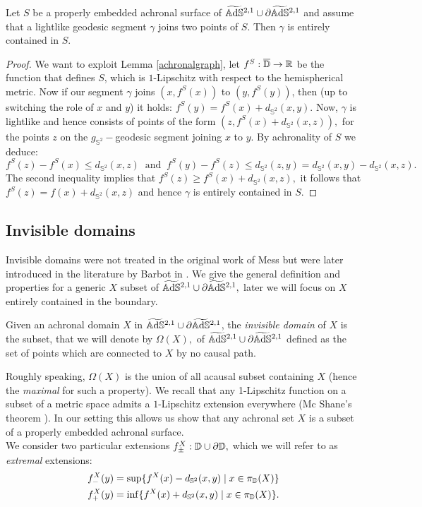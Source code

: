 \begin{lemma}\label{containedgeo}
    Let $S$ be a properly embedded achronal surface of $\widetilde{\mathbb{A}\mathrm{d}\mathbb{S}}{}^{2,1}\cup\partial\widetilde{\mathbb{A}\mathrm{d}\mathbb{S}}{}^{2,1}$ and assume that a lightlike geodesic segment $\gamma$ joins two points of $S$. Then $\gamma$ is entirely contained in $S.$
\end{lemma}
\begin{proof}
    We want to exploit Lemma \ref{achronalgraph}, let $f^S:\overline{\mathbb{D}}\to\mathbb{R}$ be the function that defines $S$, which is $1$-Lipschitz with respect to the hemispherical metric. Now if our segment $\gamma$ joins $(x,f^S(x))$ to $(y,f^S(y))$, then (up to switching the role of $x$ and $y$) it holds: $f^S(y)=f^S(x)+d_{\mathbb{S}^2}(x,y).$ Now, $\gamma$ is lightlike and hence consists of points of the form $(z,f^S(x)+d_{\mathbb{S}^2}(x,z)),$ for the points $z$ on the $g_{\mathbb{S}^2}-$geodesic segment joining $x$ to $y$. By achronality of $S$ we deduce: 
        \[
            f^S(z)-f^S(x)\leq d_{\mathbb{S}^2}(x,z)\;\;\text{and}\;\;f^S(y)-f^S(z)\leq d_{\mathbb{S}^2}(z,y)=d_{\mathbb{S}^2}(x,y)-d_{\mathbb{S}^2}(x,z).
        \]
        The second inequality implies that $f^S(z)\geq f^S(x)+d_{\mathbb{S}^2}(x,z),$ it follows that $f^S(z)=f(x)+d_{\mathbb{S}^2}(x,z)$ and hence $\gamma$ is entirely contained in $S.$
\end{proof}

\subsection{Invisible domains}
Invisible domains were not treated in the original work of Mess but were later introduced in the literature by Barbot in \cite{barbot2008causal}. We give the general definition and properties for a generic $X$ subset of $\widetilde{\mathbb{A}\mathrm{d}\mathbb{S}}{}^{2,1}\cup\partial  \widetilde{\mathbb{A}\mathrm{d}\mathbb{S}}{}^{2,1},$ later we will focus on $X$ entirely contained in the boundary. 

\begin{definition}
    Given an achronal domain $X$ in $\widetilde{\mathbb{A}\mathrm{d}\mathbb{S}}{}^{2,1}\cup\partial\widetilde{\mathbb{A}\mathrm{d}\mathbb{S}}{}^{2,1}$, the \textit{invisible domain} of $X$ is the subset, that we will denote by $\Omega(X),$ of $\widetilde{\mathbb{A}\mathrm{d}\mathbb{S}}{}^{2,1}\cup\partial\widetilde{\mathbb{A}\mathrm{d}\mathbb{S}}{}^{2,1}$ defined as the set of points which are connected to $X$ by no causal path.   
\end{definition}

Roughly speaking, $\Omega(X)$ is the union of all acausal subset containing $X$ (hence the \textit{maximal} for such a property). We recall that any 1-Lipschitz function on a subset of a metric space admits a $1$-Lipschitz extension everywhere (Mc Shane's theorem \cite{mcshane1934extension}). In our setting this allows us show that any achronal set $X$ is a subset of a properly embedded achronal surface.\\
We consider two particular extensions $f_\pm^X:\mathbb{D}\cup\partial\mathbb{D},$ which we will refer to as \textit{extremal} extensions:
\begin{align*}
    f_-^X(y)&=\sup\{f^X(x)-d_{\mathbb{S}^2}(x,y)\;|\;x\in\pi_{\mathbb{D}}(X)\}    \\
    f_+^X(y)&=\inf\{f^X(x)+d_{\mathbb{S}^2}(x,y)\;|\;x\in\pi_{\mathbb{D}}(X)\}.
\end{align*}
    
